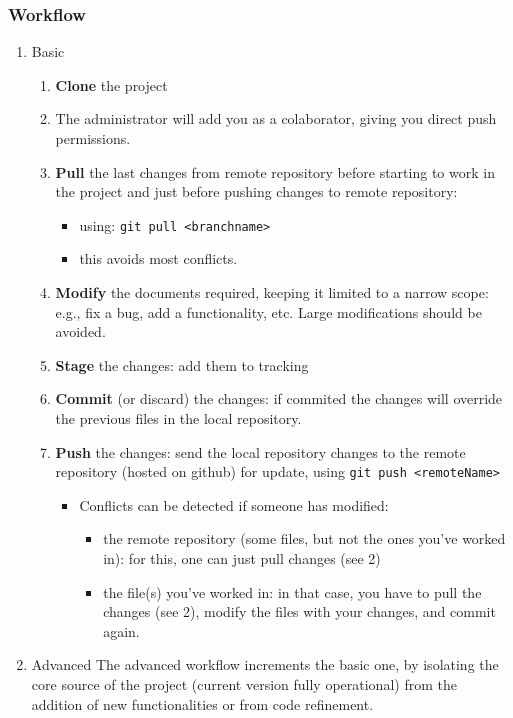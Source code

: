 \documentclass[11pt]{article}
\begin{document}
\subsubsection{Workflow}
\label{sec:orgc1f6901}
\begin{enumerate}
\item Basic
\label{sec:org7bfd8b9}
\begin{enumerate}
\item \textbf{Clone} the project
\item The administrator will add you as a colaborator, giving you direct push
permissions.
\item \textbf{Pull} the last changes from remote repository before starting to work in
the project and just before pushing changes to remote repository:
\begin{itemize}
\item using:  \texttt{git pull <branchname>}
\item this avoids most conflicts.
\end{itemize}
\item \textbf{Modify} the documents required, keeping it limited to a narrow scope: e.g.,
fix a bug, add a functionality, etc. Large modifications should be avoided.
\item \textbf{Stage} the changes: add them to tracking
\item \textbf{Commit} (or discard) the changes: if commited the changes will override the
previous files in the local repository.
\item \textbf{Push} the changes: send the local repository changes to the remote
repository (hosted on github) for update, using \texttt{git push <remoteName>}
\begin{itemize}
\item Conflicts can be detected if someone has modified:
\begin{itemize}
\item the remote repository (some files, but not the ones you've worked in):
for this, one can just pull changes (see 2)
\item the file(s) you've worked in: in that case, you have to pull the changes
(see 2), modify the files with your changes, and commit again.
\end{itemize}
\end{itemize}
\end{enumerate}
\item Advanced
\label{sec:org651005b}
The advanced workflow increments the basic one, by isolating the core source of
the project (current version fully operational) from the addition of new
functionalities or from code refinement. 


\end{enumerate}
\end{document}
